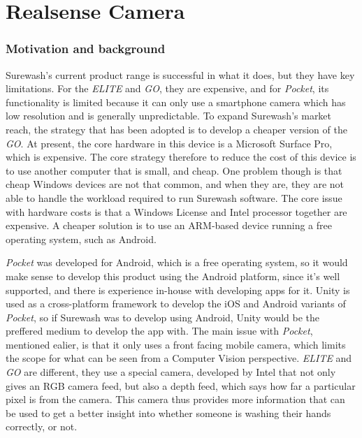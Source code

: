 \part{Realsense Camera}
\label{part:rscam}
\section{Motivation and background}
Surewash's current product range is successful in what it does, but they have key limitations. For the {\slshape ELITE} and {\slshape GO}, they are expensive, and for {\slshape Pocket}, its functionality is limited because it can only use a smartphone camera which has low resolution and is generally unpredictable. To expand Surewash's market reach, the strategy that has been adopted is to develop a cheaper version of the {\slshape GO}. At present, the core hardware in this device is a Microsoft Surface Pro, which is expensive. The core strategy therefore to reduce the cost of this device is to use another computer that is small, and cheap. One problem though is that cheap Windows devices are not that common, and when they are, they are not able to handle the workload required to run Surewash software. The core issue with hardware costs is that a Windows License and Intel processor together are expensive. A cheaper solution is to use an ARM-based device running a free operating system, such as Android.

{\slshape Pocket} was developed for Android, which is a free operating system, so it would make sense to develop this product using the Android platform, since it's well supported, and there is experience in-house with developing apps for it. Unity is used as a cross-platform framework to develop the iOS and Android variants of {\slshape Pocket}, so if Surewash was to develop using Android, Unity would be the preffered medium to develop the app with. The main issue with {\slshape Pocket}, mentioned ealier, is that it only uses a front facing mobile camera, which limits the scope for what can be seen from a Computer Vision perspective. {\slshape ELITE} and {\slshape GO} are different, they use a special camera, developed by Intel that not only gives an RGB camera feed, but also a depth feed, which says how far a particular pixel is from the camera. This camera thus provides more information that can be used to get a better insight into whether someone is washing their hands correctly, or not.

